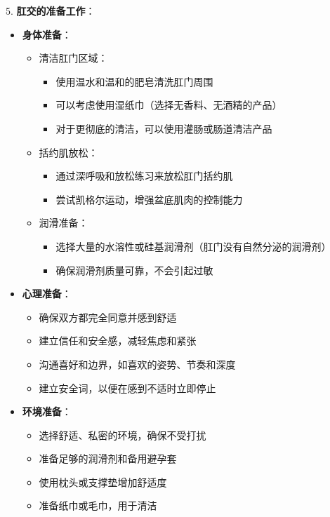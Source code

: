 \documentclass[12pt,UTF8]{ctexbook}
\begin{document}
5. \textbf{肛交的准备工作}：
\begin{itemize}
	\item \textbf{身体准备}：
	\begin{itemize}
		\item 清洁肛门区域：
		\begin{itemize}
			\item 使用温水和温和的肥皂清洗肛门周围
			\item 可以考虑使用湿纸巾（选择无香料、无酒精的产品）
			\item 对于更彻底的清洁，可以使用灌肠或肠道清洁产品
		\end{itemize}
		\item 括约肌放松：
		\begin{itemize}
			\item 通过深呼吸和放松练习来放松肛门括约肌
			\item 尝试凯格尔运动，增强盆底肌肉的控制能力
		\end{itemize}
		\item 润滑准备：
		\begin{itemize}
			\item 选择大量的水溶性或硅基润滑剂（肛门没有自然分泌的润滑剂）
			\item 确保润滑剂质量可靠，不会引起过敏
		\end{itemize}
	\end{itemize}
	\item \textbf{心理准备}：
	\begin{itemize}
		\item 确保双方都完全同意并感到舒适
		\item 建立信任和安全感，减轻焦虑和紧张
		\item 沟通喜好和边界，如喜欢的姿势、节奏和深度
		\item 建立安全词，以便在感到不适时立即停止
	\end{itemize}
	\item \textbf{环境准备}：
	\begin{itemize}
		\item 选择舒适、私密的环境，确保不受打扰
		\item 准备足够的润滑剂和备用避孕套
		\item 使用枕头或支撑垫增加舒适度
		\item 准备纸巾或毛巾，用于清洁
	\end{itemize}
\end{itemize}
\end{document}
